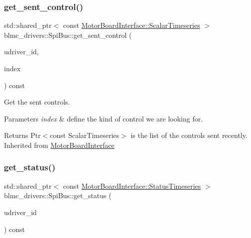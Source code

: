 \subsubsection{\texorpdfstring{get\+\_\+sent\+\_\+control()}{get\_sent\_control()}}
{\footnotesize\ttfamily std\+::shared\+\_\+ptr$<$ const \hyperlink{classblmc__drivers_1_1MotorBoardInterface_a14e237254ba495a66091ea3a3a33fa75}{Motor\+Board\+Interface\+::\+Scalar\+Timeseries} $>$ blmc\+\_\+drivers\+::\+Spi\+Bus\+::get\+\_\+sent\+\_\+control (\begin{DoxyParamCaption}\item[{const size\+\_\+t}]{udriver\+\_\+id,  }\item[{const \hyperlink{classblmc__drivers_1_1MotorBoardInterface_a82ed4d0fa527521707281396095a88ca}{Motor\+Board\+Interface\+::\+Control\+Index} \&}]{index }\end{DoxyParamCaption}) const\hspace{0.3cm}{\ttfamily [virtual]}}



Get the sent controls. 


\begin{DoxyParams}{Parameters}
{\em index} & define the kind of control we are looking for. \\
\hline
\end{DoxyParams}
\begin{DoxyReturn}{Returns}
Ptr$<$const Scalar\+Timeseries$>$ is the list of the controls sent recently. Inherited from \hyperlink{classblmc__drivers_1_1MotorBoardInterface}{Motor\+Board\+Interface} 
\end{DoxyReturn}
\mbox{\label{classblmc__drivers_1_1SpiBus_a80113b000cb68ee9869235ed42a3c547}} 
\subsubsection{\texorpdfstring{get\+\_\+status()}{get\_status()}}
{\footnotesize\ttfamily std\+::shared\+\_\+ptr$<$ const \hyperlink{classblmc__drivers_1_1MotorBoardInterface_ae3777e484dda60c4abe87f2b542ddfb8}{Motor\+Board\+Interface\+::\+Status\+Timeseries} $>$ blmc\+\_\+drivers\+::\+Spi\+Bus\+::get\+\_\+status (\begin{DoxyParamCaption}\item[{const size\+\_\+t}]{udriver\+\_\+id }\end{DoxyParamCaption}) const\hspace{0.3cm}{\ttfamily [virtual]}}



